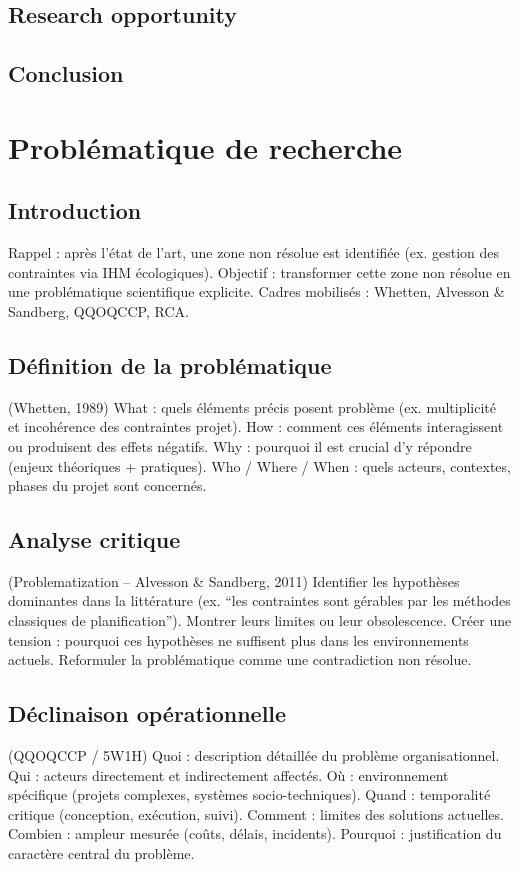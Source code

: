 \documentclass[a4paper,12pt]{article}
\begin{document}
\subsection{Research opportunity}
\label{sec:org1991ad4}

\subsection{Conclusion}
\label{sec:org9068110}
\clearpage
\section{Problématique de recherche}
\label{sec:org744ea89}
\subsection{Introduction}
\label{sec:org4f611fc}
Rappel : après l’état de l’art, une zone non résolue est identifiée (ex. gestion des contraintes via IHM écologiques).
Objectif : transformer cette zone non résolue en une problématique scientifique explicite.
Cadres mobilisés : Whetten, Alvesson \& Sandberg, QQOQCCP, RCA.
\subsection{Définition de la problématique}
\label{sec:orgfa1be84}
(Whetten, 1989)
What : quels éléments précis posent problème (ex. multiplicité et incohérence des contraintes projet).
How : comment ces éléments interagissent ou produisent des effets négatifs.
Why : pourquoi il est crucial d’y répondre (enjeux théoriques + pratiques).
Who / Where / When : quels acteurs, contextes, phases du projet sont concernés.
\subsection{Analyse critique}
\label{sec:org28f4f43}
(Problematization – Alvesson \& Sandberg, 2011)
Identifier les hypothèses dominantes dans la littérature (ex. “les contraintes sont gérables par les méthodes classiques de planification”).
Montrer leurs limites ou leur obsolescence.
Créer une tension : pourquoi ces hypothèses ne suffisent plus dans les environnements actuels.
Reformuler la problématique comme une contradiction non résolue.
\subsection{Déclinaison opérationnelle}
\label{sec:orge3b1225}
(QQOQCCP / 5W1H)
Quoi : description détaillée du problème organisationnel.
Qui : acteurs directement et indirectement affectés.
Où : environnement spécifique (projets complexes, systèmes socio-techniques).
Quand : temporalité critique (conception, exécution, suivi).
Comment : limites des solutions actuelles.
Combien : ampleur mesurée (coûts, délais, incidents).
Pourquoi : justification du caractère central du problème.
\end{document}
